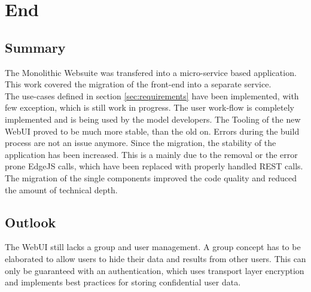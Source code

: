 
\chapter{End}



\section{Summary}
The Monolithic Websuite was transfered into a micro-service based application. This work covered the migration of the front-end into a separate service.\\
The use-cases defined in section \ref{sec:requirements} have been implemented, with few exception,  which is still work in progress. The user work-flow is completely implemented and is being used by the model developers. The Tooling of the new WebUI proved to be much more stable, than the old on. Errors during the build process are not an issue anymore. Since the migration, the stability of the application has been increased. This is a mainly due to the removal or the error prone EdgeJS calls, which have been replaced with properly handled REST calls. The migration of the single components improved the code quality and reduced the amount of technical depth.



\section{Outlook}
The WebUI still lacks a group and user management. A group concept has to be elaborated to allow users to hide their data and results from other users. This can only be guaranteed with an authentication, which uses transport layer encryption and implements best practices for storing confidential user data.
